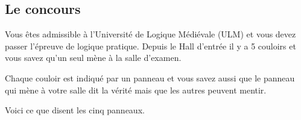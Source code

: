 \subsection{Le concours}
Vous êtes admissible à l'Université de Logique Médiévale (ULM) et vous devez passer l'épreuve de logique pratique. Depuis le Hall d'entrée il y a 5 couloirs et vous savez qu'un seul mène à la salle d'examen.

Chaque couloir est indiqué par un panneau et vous savez aussi que le panneau qui mène à votre salle dit la vérité mais que les autres peuvent mentir.

Voici ce que disent les cinq panneaux.

